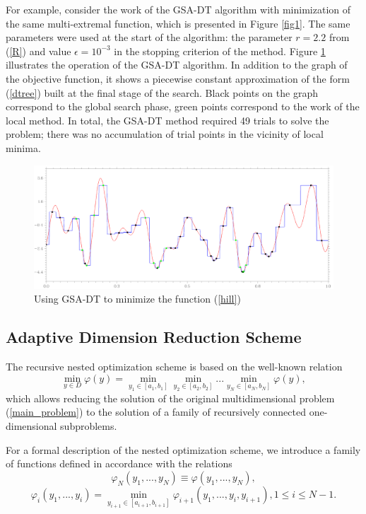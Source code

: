 \documentclass[entropy,article,submit,moreauthors,pdftex]{Definitions/mdpi}
\begin{document}
For example, consider the work of the GSA-DT algorithm with minimization of the same multi-extremal function, which is presented in Figure \ref{fig1}. The same parameters were used at the start of the algorithm: the parameter  $r=2.2$ from (\ref{R}) and value $\epsilon = 10^{-3}$ in the stopping criterion of the method. 
Figure \ref{fig2} illustrates the operation of the GSA-DT algorithm. In addition to the graph of the objective function, it shows a piecewise constant approximation of the form (\ref{dtree}) built at the final stage of the search. Black points on the graph correspond to the global search phase, green points correspond to the work of the local method. In total, the GSA-DT method required 49 trials to solve the problem; there was no accumulation of trial points in the vicinity of local minima.
 
\begin{figure}[H]
\includegraphics[width=1.0\linewidth]{HillTree90.png}
\caption{Using GSA-DT to minimize the function (\ref{hill}) }
\label{fig2}
\end{figure}   


\subsection{Adaptive Dimension Reduction Scheme}

The recursive nested optimization scheme is based on the well-known relation  \cite{Grishagin2001} 
\begin{equation}\label{nested}
\min_{y \in D}\varphi(y) = \min_{y_1\in\left[a_1,b_1\right]}\min_{y_2\in\left[a_2,b_2\right]}...\min_{y_N\in\left[a_N,b_N\right]}\varphi(y),
\end{equation}
which allows reducing the solution of the original multidimensional problem (\ref{main_problem}) to the solution of a family of recursively connected one-dimensional subproblems.

For a formal description of the nested optimization scheme, we introduce a family of functions defined in accordance with the relations
\begin{equation}\label{nested_N}
\varphi_N(y_1,...,y_N) \equiv \varphi(y_1,...,y_N),
\end{equation}
\begin{equation}\label{nested_i}
\varphi_i(y_1,...,y_i) = \min_{ y_{i+1} \in\left[a_{i+1},b_{i+1}\right]} \varphi_{i+1}(y_1,...,y_i,y_{i+1}), 1\leq i\leq N-1.
\end{equation}
\end{document}
